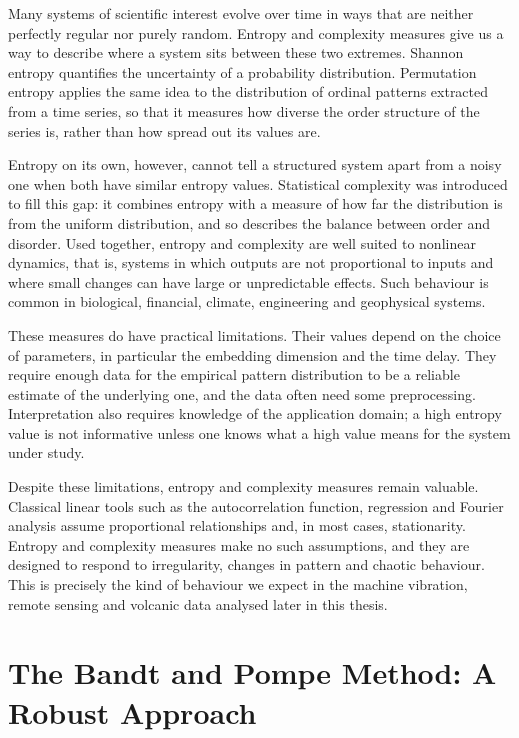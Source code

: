 Many systems of scientific interest evolve over time in ways that are neither perfectly regular nor purely random. Entropy and complexity measures give us a way to describe where a system sits between these two extremes. Shannon entropy quantifies the uncertainty of a probability distribution. Permutation entropy applies the same idea to the distribution of ordinal patterns extracted from a time series, so that it measures how diverse the order structure of the series is, rather than how spread out its values are.

Entropy on its own, however, cannot tell a structured system apart from a noisy one when both have similar entropy values. Statistical complexity was introduced to fill this gap: it combines entropy with a measure of how far the distribution is from the uniform distribution, and so describes the balance between order and disorder. Used together, entropy and complexity are well suited to nonlinear dynamics, that is, systems in which outputs are not proportional to inputs and where small changes can have large or unpredictable effects. Such behaviour is common in biological, financial, climate, engineering and geophysical systems.

These measures do have practical limitations. Their values depend on the choice of parameters, in particular the embedding dimension and the time delay. They require enough data for the empirical pattern distribution to be a reliable estimate of the underlying one, and the data often need some preprocessing. Interpretation also requires knowledge of the application domain; a high entropy value is not informative unless one knows what a high value means for the system under study.

Despite these limitations, entropy and complexity measures remain valuable. Classical linear tools such as the autocorrelation function, regression and Fourier analysis assume proportional relationships and, in most cases, stationarity. Entropy and complexity measures make no such assumptions, and they are designed to respond to irregularity, changes in pattern and chaotic behaviour. This is precisely the kind of behaviour we expect in the machine vibration, remote sensing and volcanic data analysed later in this thesis.

\section{The Bandt and Pompe Method: A Robust Approach} \label{Sec:BP method}

